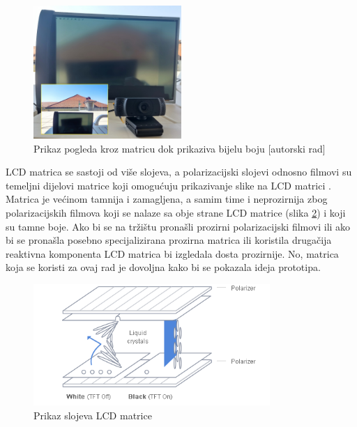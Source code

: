 \documentclass{foi}
\begin{document}
\begin{figure}[h!]
    \centering
    \includegraphics[width=0.5\textwidth]{slike/prototip_matrica}
    \caption{Prikaz pogleda kroz matricu dok prikaziva bijelu boju [autorski rad]}
    \label{fig:prototip_matrica}
\end{figure}

LCD matrica se sastoji od više slojeva, a polarizacijski slojevi odnosno filmovi su temeljni dijelovi matrice koji omogućuju prikazivanje slike na LCD matrici \cite{SamsungSDI}. Matrica je većinom tamnija i zamagljena, a samim time i neprozirnija zbog polarizacijskih filmova koji se nalaze sa obje strane LCD matrice (slika \ref{fig:slojevi_matrica}) i koji su tamne boje. Ako bi se na tržištu pronašli prozirni polarizacijski filmovi ili ako bi se pronašla posebno specijalizirana prozirna matrica ili koristila drugačija reaktivna komponenta LCD matrica bi izgledala dosta prozirnije. No, matrica koja se koristi za ovaj rad je dovoljna kako bi se pokazala ideja prototipa.

\begin{figure}[h!]
    \centering
    \includegraphics[width=0.8\textwidth]{slike/prototip_slojevi_matrice}
    \caption{Prikaz slojeva LCD matrice \cite{SamsungSDI}}
    \label{fig:slojevi_matrica}
\end{figure}
\end{document}
